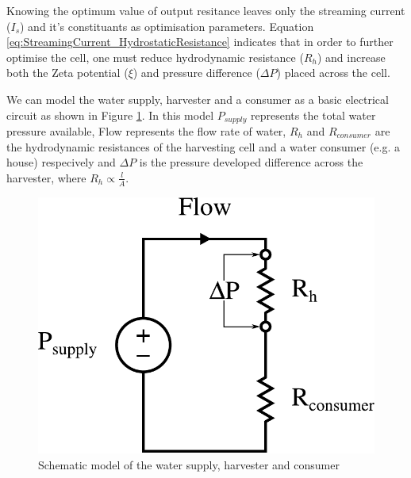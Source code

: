 Knowing the optimum value of output resitance leaves only the streaming current
($I_{s}$) and it's constituants as optimisation parameters.  Equation
\ref{eq:StreamingCurrent_HydrostaticResistance} indicates that in order to
further optimise the cell, one must reduce hydrodynamic resistance ($R_{h}$)
and increase both the Zeta potential ($\xi$) and pressure difference ($\Delta
P$) placed across the cell.

We can model the water supply, harvester and a consumer as a basic electrical
circuit as shown in Figure \ref{fig:Schematic-model-of-harvester}.  In this
model $P_{supply}$ represents the total water pressure available, Flow
represents the flow rate of water, $R_{h}$ and $R_{consumer}$ are the
hydrodynamic resistances of the harvesting cell and a water consumer (e.g. a
house) respecively and $\Delta P$ is the pressure developed difference across
the harvester, where $R_{h}\propto\frac{l}{A}$.

\begin{figure} \begin{centering}
        \includegraphics[scale=0.55]{content/pt1/01-PowerHarvesting/graphics/Harvester_equivalentCircuit_output}
        \par\end{centering}

\protect\caption{\label{fig:Schematic-model-of-harvester}Schematic model of the
    water supply, harvester and consumer}


\end{figure}


